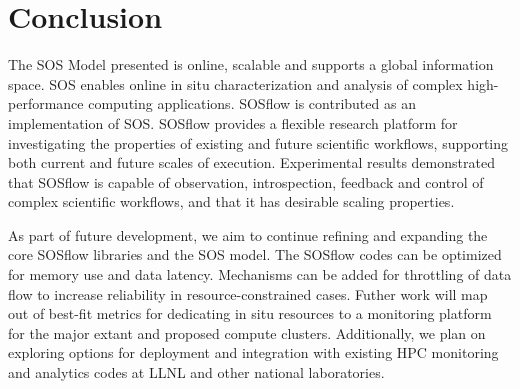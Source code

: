 

%
%
%

\section{Conclusion}
%
The SOS Model presented is online, scalable and supports a global
information space.
%
SOS enables online in situ characterization and analysis of complex
high-performance computing applications.
%
SOSflow is contributed as an implementation of SOS.
%
SOSflow provides a flexible research platform for investigating the
properties of existing and future scientific workflows, supporting
both current and future scales of execution.
%
Experimental results demonstrated that SOSflow is capable of
observation, introspection, feedback and control of complex scientific
workflows, and that it has desirable scaling properties.
%
\par
%
As part of future development, we aim to continue refining and
expanding the core SOSflow libraries and the SOS model.
%
The SOSflow codes can be optimized for memory use and data latency.
%
Mechanisms can be added for throttling of data flow to increase
reliability in resource-constrained cases.
%
Futher work will map out of best-fit metrics for dedicating in situ
resources to a monitoring platform for the major extant and proposed
compute clusters.
%
Additionally, we plan on exploring options for deployment and
integration with existing HPC monitoring and analytics codes at LLNL
and other national laboratories.
%
%


